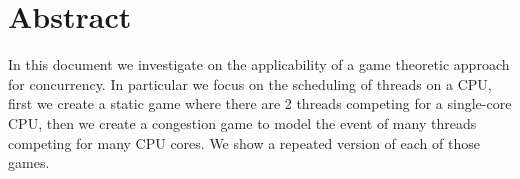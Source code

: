 \section*{Abstract}

In this document we investigate on the applicability of a game theoretic approach for concurrency.
In particular we focus on the scheduling of threads on a CPU, first we 
create a static game where there are 2 threads competing for a single-core CPU,
then we create a congestion game to model the event of many threads competing for many CPU cores.
We show a repeated version of each of those games.
